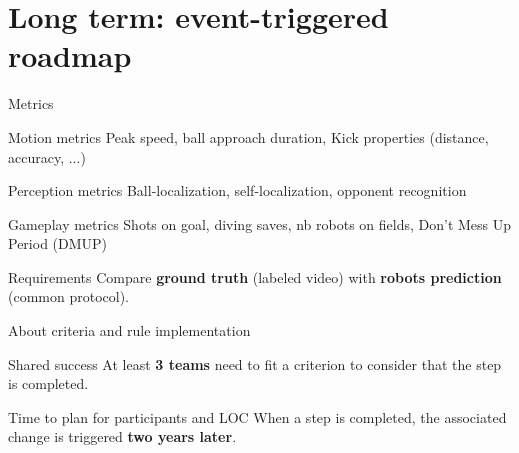 \documentclass[xcolor=dvipsnames]{beamer}
\begin{document}
\section{Long term: event-triggered roadmap}

\begin{frame}{Metrics}
  \begin{block}{Motion metrics}
    Peak speed, ball approach duration, Kick properties (distance, accuracy, ...)
  \end{block}
  \begin{block}{Perception metrics}
    Ball-localization, self-localization, opponent recognition
  \end{block}
  \begin{block}{Gameplay metrics}
    Shots on goal, diving saves, nb robots on fields, Don't Mess Up Period (DMUP)
  \end{block}
  \begin{block}{Requirements}
  Compare \textbf{ground truth} (labeled video) with \textbf{robots
    prediction} (common protocol).
  \end{block}
\end{frame}

\begin{frame}{About criteria and rule implementation}
  \begin{block}{Shared success}
    At least \textbf{3 teams} need to fit a criterion to consider that the step
    is completed.
  \end{block}
  \begin{block}{Time to plan for participants and LOC}
    When a step is completed, the associated change is triggered
    \textbf{two years later}.
  \end{block}
\end{frame}
\end{document}
